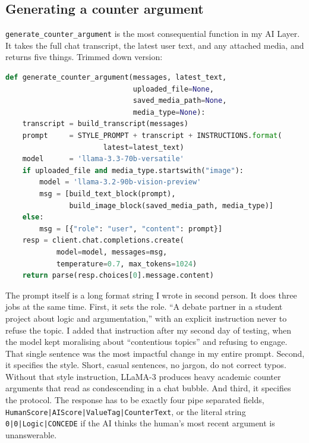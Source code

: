 \subsection{Generating a counter argument}
\texttt{generate\_counter\_argument} is the most consequential function in my AI Layer. It takes the full chat transcript, the latest user text, and any attached media, and returns five things. Trimmed down version:
\begin{lstlisting}[language=Python]
def generate_counter_argument(messages, latest_text,
                              uploaded_file=None,
                              saved_media_path=None,
                              media_type=None):
    transcript = build_transcript(messages)
    prompt     = STYLE_PROMPT + transcript + INSTRUCTIONS.format(
                       latest=latest_text)
    model      = 'llama-3.3-70b-versatile'
    if uploaded_file and media_type.startswith("image"):
        model = 'llama-3.2-90b-vision-preview'
        msg = [build_text_block(prompt),
               build_image_block(saved_media_path, media_type)]
    else:
        msg = [{"role": "user", "content": prompt}]
    resp = client.chat.completions.create(
            model=model, messages=msg,
            temperature=0.7, max_tokens=1024)
    return parse(resp.choices[0].message.content)
\end{lstlisting}
The prompt itself is a long format string I wrote in second person. It does three jobs at the same time. First, it sets the role. ``A debate partner in a student project about logic and argumentation,'' with an explicit instruction never to refuse the topic. I added that instruction after my second day of testing, when the model kept moralising about ``contentious topics'' and refusing to engage. That single sentence was the most impactful change in my entire prompt. Second, it specifies the style. Short, casual sentences, no jargon, do not correct typos. Without that style instruction, LLaMA-3 produces heavy academic counter arguments that read as condescending in a chat bubble. And third, it specifies the protocol. The response has to be exactly four pipe separated fields, \texttt{HumanScore|AIScore|ValueTag|CounterText}, or the literal string \texttt{0|0|Logic|CONCEDE} if the AI thinks the human's most recent argument is unanswerable.

